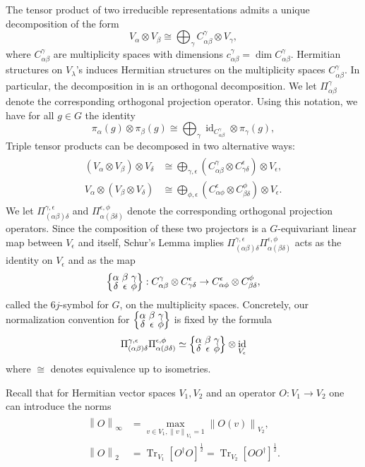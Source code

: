 \documentclass[pdflatex, sn-mathphys-num]{sn-jnl} %
\theoremstyle{plain}
\theoremstyle{definition}
\let\cref\crtcref
\DeclareMathOperator{\Tr}{Tr}
\DeclareMathOperator{\id}{id}
\newcommand{\norm}[1]{\left\lVert#1\right\rVert}
\newcommand{\ot}{\otimes} %
\newcommand{\projl}{\Pi_{(\ya \yb) \yd}^{\yc, \ye}}
\newcommand{\projr}{\Pi_{\ya (\yb \yd)}^{\ye, \yf}}
\newcommand{\ya}{\alpha}
\newcommand{\yb}{\beta}
\newcommand{\yc}{\gamma}
\newcommand{\yd}{\delta}
\newcommand{\ye}{\epsilon}
\newcommand{\yf}{\phi}
\newcommand{\yx}{\lambda}
\newcommand{\tightcurlysixj}[1]{
\begingroup
\arraycolsep=1.5pt
\renewcommand{\arraystretch}{0.3}
\left\{\!\begin{array}{ccc}
    #1
\end{array}\!\right\}
\endgroup
}
\newcommand{\abcdefsymbol}{\tightcurlysixj{\alpha & \beta & \gamma \\ \delta & \epsilon & \phi}}
\begin{document}
The tensor product of two irreducible representations admits a unique decomposition of the form
\begin{equation}
    \label{eq:tensor_product}
    V_\ya \ot V_\yb \cong \bigoplus_\yc C_{\ya \yb}^\yc \ot V_\yc,
\end{equation}
where $C_{\ya \yb}^\yc$ are multiplicity spaces with dimensions $c_{\ya \yb}^\yc = \dim  C_{\ya \yb}^\yc$.
Hermitian structures on $V_\yx$'s induces  Hermitian structures on the multiplicity spaces $C_{\ya \yb}^\yc$.
In particular, the decomposition in \cref{eq:tensor_product} is an orthogonal decomposition.
We let $\Pi_{\ya \yb}^\yc$ denote the corresponding orthogonal projection operator.
Using this notation, we have for all $g \in G$ the identity
\begin{equation}
    \label{eq:operator product}
    \pi_\ya(g) \ot \pi_\yb(g) \cong \bigoplus_{\yc} \id_{C_{\ya \yb}^\yc} \ot \pi_\yc(g),
\end{equation}
Triple tensor products can be decomposed in two alternative ways:
\begin{align}
    \label{eq:triple_tensor_product}
    \begin{split}
        (V_\ya \ot V_\yb) \ot V_\yd
        &\cong \bigoplus_{\yc, \ye} (C_{\ya \yb}^\yc \ot C_{\yc \yd}^\ye) \ot V_\ye,\\
        V_\ya \ot (V_\yb \ot V_\yd)
        &\cong \bigoplus_{\yf, \ye} (C_{\ya \yf}^\ye \ot C_{\yb \yd}^\yf)\ot V_\ye.
    \end{split}
\end{align}
We let $\projl$ and $\projr$ denote the corresponding orthogonal projection operators.
Since the composition of these two projectors is a $G$-equivariant linear map between $V_{\ye}$ and itself, Schur's Lemma implies $\projl \projr$ acts as the identity on $V_{\ye}$ and as the map
\begin{equation}
   \abcdefsymbol : C_{\ya \yb}^\yc \ot C_{\yc \yd}^\ye \to C_{\ya \yf}^\ye \ot C_{\yb \yd}^\yf,
\end{equation}
called the $6j$-symbol for $G$, on the multiplicity spaces.
Concretely, our normalization convention for $\abcdefsymbol$ is fixed by the formula
\begin{equation}
    \label{eq:prod_proj_6j}
    \projl \projr \simeq
    \abcdefsymbol \ot \id_{V_{\ye}}
\end{equation}
where $\cong$ denotes equivalence up to isometries.

Recall that for Hermitian vector spaces $V_{1}, V_{2}$ and an operator $O: V_{1} \to V_{2}$ one can introduce the norms
\begin{align}
    \begin{split}
        \norm{O}_{\infty} &= \max_{v \in V_1, \norm{v}_{V_1} = 1} \norm{O(v)}_{V_2}, \\
        \norm{O}_{2} &= \Tr_{V_1}[O^{\dagger} O]^{\frac{1}{2}} = \Tr_{V_2}[O O^{\dagger}]^{\frac{1}{2}}.
    \end{split}
\end{align}
\end{document}
